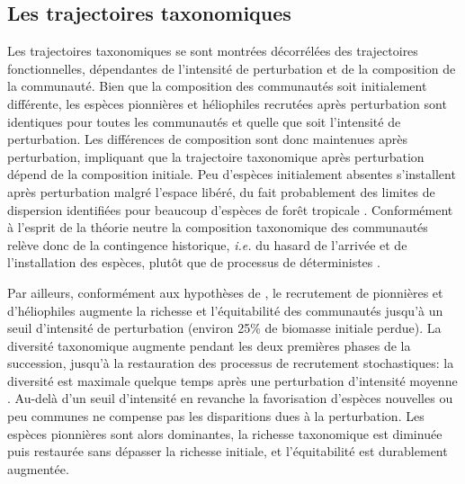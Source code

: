 \documentclass[
  11pt,
  french,
  A4paper,
  extrafontsizes,onecolumn,openright
  ]{memoir}
\begin{document}
\subsection{Les trajectoires
taxonomiques}\label{les-trajectoires-taxonomiques}

Les trajectoires taxonomiques se sont montrées décorrélées des
trajectoires fonctionnelles, dépendantes de l'intensité de perturbation
et de la composition de la communauté. Bien que la composition des
communautés soit initialement différente, les espèces pionnières et
héliophiles recrutées après perturbation sont identiques pour toutes les
communautés et quelle que soit l'intensité de perturbation. Les
différences de composition sont donc maintenues après perturbation,
impliquant que la trajectoire taxonomique après perturbation dépend de
la composition initiale. Peu d'espèces initialement absentes
s'installent après perturbation malgré l'espace libéré, du fait
probablement des limites de dispersion identifiées pour beaucoup
d'espèces de forêt tropicale \autocite{Svenning2005}. Conformément à
l'esprit de la théorie neutre la composition taxonomique des communautés
relève donc de la contingence historique, \emph{i.e.} du hasard de
l'arrivée et de l'installation des espèces, plutôt que de processus de
déterministes \autocite{Hubbell2001}.

Par ailleurs, conformément aux hypothèses de \textcite{Connell1978}, le
recrutement de pionnières et d'héliophiles augmente la richesse et
l'équitabilité des communautés jusqu'à un seuil d'intensité de
perturbation (environ 25\% de biomasse initiale perdue). La diversité
taxonomique augmente pendant les deux premières phases de la succession,
jusqu'à la restauration des processus de recrutement stochastiques: la
diversité est maximale quelque temps après une perturbation d'intensité
moyenne \autocites{Molino2001}{Guitet2018}. Au-delà d'un seuil
d'intensité en revanche la favorisation d'espèces nouvelles ou peu
communes ne compense pas les disparitions dues à la perturbation. Les
espèces pionnières sont alors dominantes, la richesse taxonomique est
diminuée puis restaurée sans dépasser la richesse initiale, et
l'équitabilité est durablement augmentée.
\end{document}

